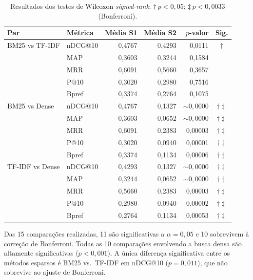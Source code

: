 \documentclass[12pt]{article}
\begin{document}
\begin{table}[ht]
\centering
\caption{Resultados dos testes de Wilcoxon \textit{signed-rank}.
$\dag\ p < 0{,}05$; $\ddag\ p < 0{,}0033$ (Bonferroni).}
\label{tab:wilcoxon}
\renewcommand{\arraystretch}{1.1}
\begin{tabular}{llrrrc}
\toprule
\textbf{Par} & \textbf{Métrica} & \textbf{Média S1} & \textbf{Média S2} & \textbf{$p$-valor} & \textbf{Sig.} \\
\midrule
BM25 vs TF-IDF  & nDCG@10 & 0{,}4767 & 0{,}4293 & 0{,}0111 & $\dag$ \\
                & MAP     & 0{,}3603 & 0{,}3244 & 0{,}1584 & \\
                & MRR     & 0{,}6091 & 0{,}5660 & 0{,}3657 & \\
                & P@10    & 0{,}3020 & 0{,}2980 & 0{,}7516 & \\
                & Bpref   & 0{,}3374 & 0{,}2764 & 0{,}1075 & \\
\midrule
BM25 vs Dense   & nDCG@10 & 0{,}4767 & 0{,}1327 & ${\sim}0{,}0000$ & $\dag\ddag$ \\
                & MAP     & 0{,}3603 & 0{,}0652 & ${\sim}0{,}0000$ & $\dag\ddag$ \\
                & MRR     & 0{,}6091 & 0{,}2383 & 0{,}00003 & $\dag\ddag$ \\
                & P@10    & 0{,}3020 & 0{,}0940 & 0{,}00001 & $\dag\ddag$ \\
                & Bpref   & 0{,}3374 & 0{,}1134 & 0{,}00006 & $\dag\ddag$ \\
\midrule
TF-IDF vs Dense & nDCG@10 & 0{,}4293 & 0{,}1327 & ${\sim}0{,}0000$ & $\dag\ddag$ \\
                & MAP     & 0{,}3244 & 0{,}0652 & ${\sim}0{,}0000$ & $\dag\ddag$ \\
                & MRR     & 0{,}5660 & 0{,}2383 & 0{,}00003 & $\dag\ddag$ \\
                & P@10    & 0{,}2980 & 0{,}0940 & 0{,}00002 & $\dag\ddag$ \\
                & Bpref   & 0{,}2764 & 0{,}1134 & 0{,}00053 & $\dag\ddag$ \\
\bottomrule
\end{tabular}
\end{table}

Das 15 comparações realizadas, 11 são significativas a $\alpha = 0{,}05$ e 10
sobrevivem à correção de Bonferroni. Todas as 10 comparações envolvendo a busca
densa são altamente significativas ($p < 0{,}001$). A única diferença
significativa entre os métodos esparsos é BM25 vs.\ TF-IDF em nDCG@10
($p = 0{,}011$), que não sobrevive ao ajuste de Bonferroni.
\end{document}
